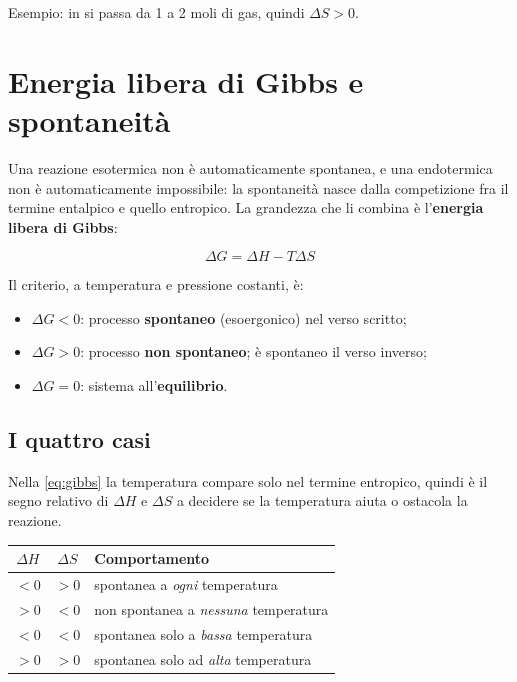 \documentclass[11pt, a4paper, openright]{book}
\begin{document}
\noindent Esempio: in  si passa da 1 a 2 moli di gas, quindi
$\Delta S > 0$.


\section{Energia libera di Gibbs e spontaneità}

Una reazione esotermica non è automaticamente spontanea, e una endotermica non è
automaticamente impossibile: la spontaneità nasce dalla competizione fra il termine
entalpico e quello entropico. La grandezza che li combina è l'\textbf{energia libera di
Gibbs}:

\begin{equation}
  \Delta G = \Delta H - T \Delta S
  \label{eq:gibbs}
\end{equation}

Il criterio, a temperatura e pressione costanti, è:

\begin{itemize}
  \item $\Delta G < 0$: processo \textbf{spontaneo} (esoergonico) nel verso scritto;
  \item $\Delta G > 0$: processo \textbf{non spontaneo}; è spontaneo il verso inverso;
  \item $\Delta G = 0$: sistema all'\textbf{equilibrio}.
\end{itemize}

\subsection{I quattro casi}

Nella \eqref{eq:gibbs} la temperatura compare solo nel termine entropico, quindi è il
segno relativo di $\Delta H$ e $\Delta S$ a decidere se la temperatura aiuta o ostacola la
reazione.

\begin{center}
\begin{tabular}{ccl}
  \toprule
  $\Delta H$ & $\Delta S$ & Comportamento \\
  \midrule
  $<0$ & $>0$ & spontanea a \emph{ogni} temperatura \\
  $>0$ & $<0$ & non spontanea a \emph{nessuna} temperatura \\
  $<0$ & $<0$ & spontanea solo a \emph{bassa} temperatura \\
  $>0$ & $>0$ & spontanea solo ad \emph{alta} temperatura \\
  \bottomrule
\end{tabular}
\end{center}
\end{document}
